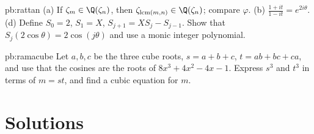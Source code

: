 \begin{hint}{pb:rattan}
(a) If $\zeta_m\in\Q(\zeta_n)$, then $\zeta_{\operatorname{lcm}(m,n)}\in\Q(\zeta_n)$; compare $\varphi$. (b)
$\frac{1+it}{1-it}=e^{2i\theta}$. (d) Define $S_0=2$, $S_1=X$, $S_{j+1}=XS_j-S_{j-1}$. Show that $S_j(2\cos\theta)=2\cos(j\theta)$ and use a monic integer polynomial.
\end{hint}

\begin{hint}{pb:ramacube}
Let $a,b,c$ be the three cube roots, $s=a+b+c$, $t=ab+bc+ca$, and use that the cosines are the roots of
$8x^3+4x^2-4x-1$. Express $s^3$ and $t^3$ in terms of $m=st$, and find a cubic equation for $m$.
\end{hint}

\section{Solutions}

